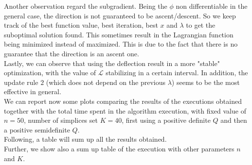 \documentclass[notitlepage]{article}
\begin{document}
Another observation regard the subgradient. Being the $\phi$ non differentiable in the general case, the direction is not guaranteed to be ascent/descent. So we keep track of the best function value, best iteration, best $x$ 
and $\lambda$ to get the suboptimal solution found. This sometimes result in the Lagrangian function being minimized instead of maximized. This is due to the fact that there is no guarantee that the direction is an ascent one.\\
Lastly, we can observe that using the deflection result in a more "stable" optimization, with the value of $\mathcal{L}$ stabilizing in a certain interval. In addition, the update rule $2$ (which does not depend on the previous $\lambda$) 
seems to be the most effective in general.\\
We can report now some plots comparing the results of the executions obtained together with the total time spent in the algorithm execution, with fixed value of $n=50$, number of simplices set $K=40$, first using a positive definite $Q$
and then a positive semidefinite $Q$.\\
Following, a table will sum up all the results obtained.\\
Further, we show also a sum up table of the execution with other parameters $n$ and $K$.\\






\end{document}
